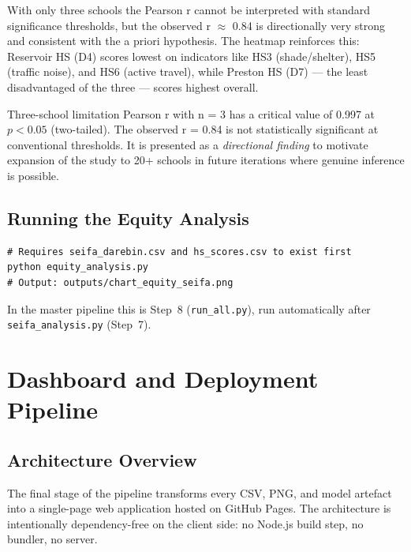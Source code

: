 \documentclass[11pt,a4paper,openany]{book}
\begin{document}
With only three schools the Pearson r cannot be interpreted with standard significance
thresholds, but the observed r $\approx$ 0.84 is directionally very strong and consistent
with the a priori hypothesis.  The heatmap reinforces this: Reservoir HS (D4) scores
lowest on indicators like HS3 (shade/shelter), HS5 (traffic noise), and HS6 (active travel),
while Preston HS (D7) --- the least disadvantaged of the three --- scores highest overall.

\begin{warnbox}{Three-school limitation}
Pearson r with n = 3 has a critical value of 0.997 at $p < 0.05$ (two-tailed).
The observed r = 0.84 is not statistically significant at conventional thresholds.
It is presented as a \emph{directional finding} to motivate expansion of the study
to 20+ schools in future iterations where genuine inference is possible.
\end{warnbox}

\section{Running the Equity Analysis}

\begin{lstlisting}[style=bash, caption={Equity analysis run command.}]
# Requires seifa_darebin.csv and hs_scores.csv to exist first
python equity_analysis.py
# Output: outputs/chart_equity_seifa.png
\end{lstlisting}

In the master pipeline this is Step~8 (\texttt{run\_all.py}), run automatically after
\texttt{seifa\_analysis.py} (Step~7).

\chapter{Dashboard and Deployment Pipeline}

\section{Architecture Overview}

The final stage of the pipeline transforms every CSV, PNG, and model artefact into a
single-page web application hosted on GitHub Pages.  The architecture is intentionally
dependency-free on the client side: no Node.js build step, no bundler, no server.
\end{document}
